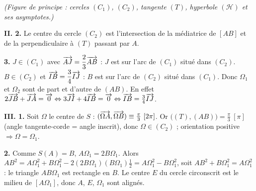 \documentclass[11pt]{article}
\begin{document}
\begin{center}
\end{center}
\begin{center}\itshape\footnotesize (Figure de principe : cercles $(C_1)$, $(C_2)$, tangente $(T)$, hyperbole $(\mathcal{H})$ et ses asymptotes.)\end{center}

\textbf{II. 2.} Le centre du cercle $(C_2)$ est l'intersection de la médiatrice de $[AB]$ et de la perpendiculaire à $(T)$ passant par $A$.

\textbf{3.} $J \in (C_1)$ avec $\overrightarrow{AJ} = \dfrac{2}{3}\overrightarrow{AB}$ : $J$ est sur l'arc de $(C_1)$ situé dans $(C_2)$. $B \in (C_2)$ et $\overrightarrow{IB} = \dfrac{3}{4}\overrightarrow{IJ}$ : $B$ est sur l'arc de $(C_2)$ situé dans $(C_1)$. Donc $\Omega_1$ et $\Omega_2$ sont de part et d'autre de $(AB)$. En effet $2\overrightarrow{JB} + \overrightarrow{JA} = \overrightarrow{0} \Leftrightarrow 3\overrightarrow{JI} + 4\overrightarrow{IB} = \overrightarrow{0} \Leftrightarrow \overrightarrow{IB} = \tfrac{3}{4}\overrightarrow{IJ}$.

\textbf{III. 1.} Soit $\Omega$ le centre de $S$ : $(\overrightarrow{\Omega A}, \overrightarrow{\Omega B}) \equiv \tfrac{\pi}{3}\ [2\pi]$. Or $\big((T),(AB)\big) = \tfrac{\pi}{3}\ [\pi]$ (angle tangente-corde = angle inscrit), donc $\Omega \in (C_2)$ ; orientation positive $\Rightarrow \Omega = \Omega_1$.

\textbf{2.} Comme $S(A) = B$, $A\Omega_1 = 2B\Omega_1$. Alors $AB^2 = A\Omega_1^2 + B\Omega_1^2 - 2(2B\Omega_1)(B\Omega_1)\tfrac{1}{2} = A\Omega_1^2 - B\Omega_1^2$, soit $AB^2 + B\Omega_1^2 = A\Omega_1^2$ : le triangle $AB\Omega_1$ est rectangle en $B$. Le centre $E$ du cercle circonscrit est le milieu de $[A\Omega_1]$, donc $A$, $E$, $\Omega_1$ sont alignés.
\end{document}

